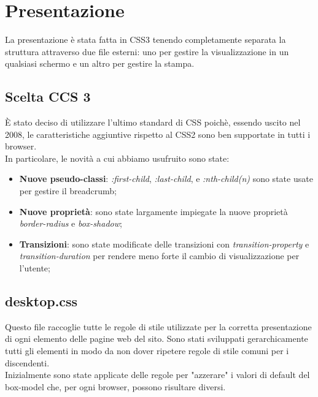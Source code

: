 \section{Presentazione}
	La presentazione è stata fatta in CSS3 tenendo completamente separata la struttura attraverso due file esterni: uno per gestire la visualizzazione in un qualsiasi schermo e un altro per gestire la stampa.
	\subsection{Scelta CCS 3}

	È stato deciso di utilizzare l'ultimo standard di CSS poichè, essendo uscito nel 2008, le  caratteristiche aggiuntive rispetto al CSS2 sono ben supportate in tutti i browser. \\ In particolare, le novità a cui abbiamo usufruito sono state:

	\begin{itemize}
		\item \textbf{Nuove pseudo-classi}: \emph{:first-child}, \emph{:last-child}, e \emph{:nth-child(n)} sono state usate per gestire il breadcrumb;
		\item \textbf{Nuove proprietà}: sono state largamente impiegate la nuove proprietà \emph{border-radius} e \emph{box-shadow};
		\item \textbf{Transizioni}: sono state modificate delle transizioni con \emph{transition-property} e \emph{transition-duration} per rendere meno forte il cambio di visualizzazione per l'utente;
	\end{itemize}
	\subsection{desktop.css}
	Questo file raccoglie tutte le regole di stile utilizzate per la corretta presentazione di ogni elemento delle pagine web del sito. Sono stati sviluppati gerarchicamente tutti gli elementi in modo da non dover ripetere regole di stile comuni per i discendenti. \\
	Inizialmente sono state applicate delle regole per "azzerare" i valori di default del box-model che, per ogni browser, possono risultare diversi.\\

